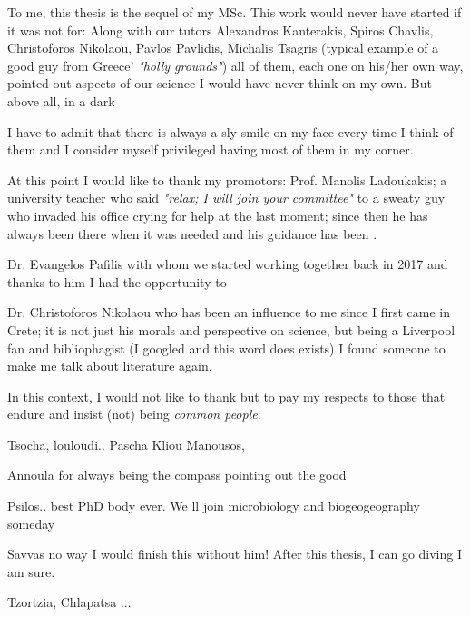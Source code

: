 \documentclass[master=elt, cleveref, autoref, masteroption=eg]{kulemt}
\begin{document}
\begin{preface}
   To me, this thesis is the sequel of my MSc. 
   This work would never have started if it was not for:
   Along with our tutors Alexandros Kanterakis, Spiros Chavlis, 
   Christoforos Nikolaou, 
   Pavlos Pavlidis, 
   Michalis Tsagris (typical example of a 
   good guy from Greece' \textit{"holly grounds"}) 
   all of them, each one on his/her own way, pointed out aspects of our science I would have never think on my own. 
   But above all, in a dark 

   I have to admit that there is always a sly smile on my face every time I think of them 
   and I consider myself privileged having most of them in my corner. 

   At this point I would like to thank my promotors: 
   Prof. Manolis Ladoukakis; a university teacher who said \textit{"relax; I will join your committee"} 
   to a sweaty guy who invaded his office crying for help at the last moment; 
   since then he has always been there when it was needed and his guidance has been . 

   Dr. Evangelos Pafilis with whom we started working together back in 2017 
   and thanks to him I had the opportunity to

   Dr. Christoforos Nikolaou who has been an influence to me since I first came in Crete; 
   it is not just his morals and perspective on science, but being a Liverpool fan and bibliophagist 
   (I googled and this word does exists)
   I found someone to make me talk about literature again. 



   In this context, I would not like to thank but to pay my respects to those that endure 
   and insist (not) being \textit{common people}.

   Tsocha, louloudi.. 
   Pascha 
   Kliou 
   Manousos, 
  
   Annoula for always being the compass pointing out the good 

   Psilos.. best PhD body ever. We ll join microbiology and biogeogeography someday 

   Savvas no way I would finish this without him! After this thesis, I can go diving I am sure. 
   
   Tzortzia, Chlapatsa ... 


\end{preface}
\end{document}
